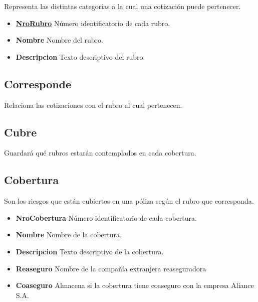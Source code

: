 \documentclass[a4paper,11pt]{article}
\begin{document}
Representa las distintas categorías a la cual una cotización puede pertenecer.

\begin{itemize}
   
  \item \textbf{\uline{NroRubro}} Número identificatorio de cada rubro.
  
  \item \textbf{Nombre} Nombre del rubro.

  \item \textbf{Descripcion} Texto descriptivo del rubro.
  
\end{itemize}

\subsection{Corresponde}

Relaciona las cotizaciones con el rubro al cual pertenecen.

\subsection{Cubre}

Guardará qué rubros estarán contemplados en cada cobertura.

\subsection{Cobertura}

Son los riesgos que están cubiertos en una póliza según el rubro que corresponda.

\begin{itemize}
   
  \item \textbf{NroCobertura} Número identificatorio de cada cobertura.
  
  \item \textbf{Nombre} Nombre de la cobertura.

  \item \textbf{Descripcion} Texto descriptivo de la cobertura.
  
  \item \textbf{Reaseguro} Nombre de la compañía extranjera reaseguradora

  \item \textbf{Coaseguro} Almacena si la cobertura tiene coaseguro con la empresa Aliance S.A.
  
\end{itemize}
\end{document}
